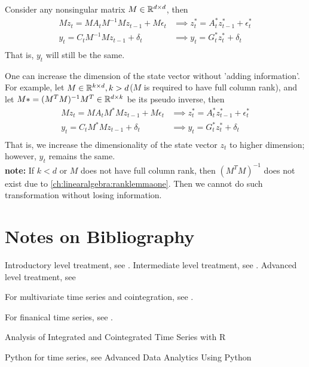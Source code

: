 \begin{remark}
Consider any nonsingular matrix $M\in \mathbb{R}^{d\times d}$, then
\begin{align*}
Mz_t = MA_tM^{-1}Mz_{t-1} + M\epsilon_t &\implies z_t^* = A_t^* z_{t-1}^* + \epsilon_t^*\\
y_t = C_tM^{-1}Mz_{t-1} + \delta_t &\implies y_t = G_t^* z_{t}^* + \delta_t\\
\end{align*}
That is, $y_t$ will still be the same.
\end{remark}

\begin{remark}
One can increase the dimension of the state vector without 'adding information'. For example, let $M\in \mathbb{R}^{k\times d},k>d$($M$ is required to have full column rank), and let $M* = (M^TM)^{-1}M^T \in \mathbb{R}^{d\times k}$ be its pseudo inverse, then
 \begin{align*}
 Mz_t = MA_tM^*Mz_{t-1} + M\epsilon_t &\implies z_t^* = A_t^* z_{t-1}^* + \epsilon_t^*\\
 y_t = C_tM^*Mz_{t-1} + \delta_t &\implies y_t = G_t^* z_{t}^* + \delta_t\\
 \end{align*}
That is, we increase the dimensionality of the state vector $z_t$ to higher dimension; however, $y_t$ remains the same.\\
\textbf{note:}
If $k<d$ or $M$ does not have full column rank, then 
$(M^TM)^{-1}$ does not exist due to \autoref{ch:linearalgebra:ranklemmaone}. Then we cannot do such transformation without losing information.
\end{remark}


\section{Notes on Bibliography}


Introductory level treatment, see \cite{chatfield2003analysis}.
Intermediate level treatment, see \cite{brockwell2002introduction}\cite{hamilton1994time}\cite{shumway2010time}.
Advanced level treatment, see \cite{brockwell1991time}


For multivariate time series and cointegration, see \cite{tsay2013multivariate}\cite{pfaff2008analysis}\cite{lutkepohl2005new}.

For finanical time series, see \cite{tsay2005analysis}\cite{tsay2013multivariate}\cite{hayashi2000econometrics}.


Analysis of Integrated and Cointegrated Time Series with R

Python for time series, see Advanced Data Analytics Using Python


\printbibliography